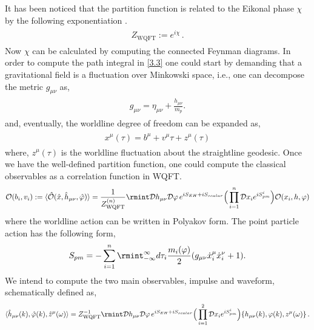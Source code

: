 It has been noticed that the partition function is related to the Eikonal phase  $\chi$ by the following exponentiation \cite{Amati:1990xe, Mogull:2020sak}.
\begin{align}
    \begin{split}
Z_{\textrm{WQFT}}:=e^{i\chi}\,.
    \end{split}
\end{align}
Now $\chi$ can be calculated by computing the connected Feynman diagrams. In order to compute the path integral in \eqref{3.3} one could start by demanding that a gravitational field is a fluctuation over Minkowski space, i.e., one can decompose the metric $g_{\mu\nu}$ as,
\begin{align}
    \begin{split}
g_{\mu\nu}=\eta_{\mu\nu}+\frac{h_{\mu\nu}}{m_p}.
    \end{split}
\end{align}
and, eventually, the worldline degree of freedom can be expanded as,
\begin{align}
    \begin{split}
        x^{\mu}(\tau)=b^{\mu}+v^{\mu}\tau+z^{\mu}(\tau)
    \end{split}
\end{align}
where, $z^{\mu}(\tau)$ is the worldline fluctuation about the straightline geodesic. Once we have the well-defined partition function, one could compute the classical observables as a correlation function in WQFT.
\begin{align}
    \begin{split}
        \mathcal{O}(b_i,v_i):=\langle\hat{\mathcal{O}}(\hat{x},\hat{h}_{\mu\nu},\hat\varphi)\rangle=\frac{1}{Z^{(n)}_{\textrm{WQFT}}}\rmint \mathcal{D}h_{\mu\nu}\mathcal{D}\varphi\,e^{iS_{EH}+iS_{scalar}}\Big(\prod_{i=1}^{n}\mathcal{D}x_{i}e^{iS_{pm}^i}\Big)\mathcal{O}(x_i,h,\varphi)
    \end{split}
\end{align}
where the worldline action can be written in Polyakov form.
The point particle action has the following form,
\begin{align}
    \begin{split}
        S_{pm}=-\sum_{i=1}^{n}\rmint_{-\infty}^{\infty}d\tau_i\frac{m_i( \varphi)}{2}(g_{\mu\nu}\dot x^{\mu}_i\dot{x}^{\nu}_i+1).\label{3.4m}
    \end{split}
\end{align}
We intend to compute the two main observables, impulse and waveform, schematically defined as,
\begin{align}
    \begin{split}
      \langle \hat h_{\mu\nu}(k),\hat\varphi(k),\hat z^{\mu}(\omega)\rangle=Z_{\textrm{WQFT}}^{-1}\rmint\mathcal{D}h_{\mu\nu}\mathcal{D}\varphi\,e^{iS_{EH}+iS_{scalar}}\Big(\prod_{i=1}^{2}\mathcal{D}x_{i}e^{iS_{pm}^i}\Big)\{h_{\mu\nu}(k),\varphi(k),z^{\mu}(\omega)\}\,.
    \end{split}
\end{align}
